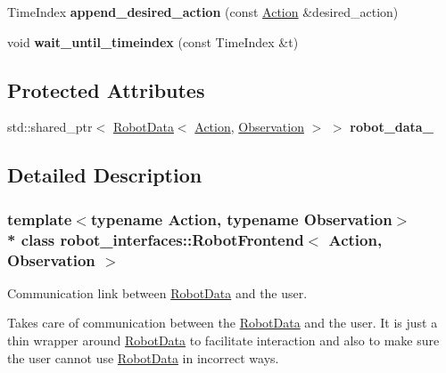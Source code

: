 \begin{DoxyCompactItemize}
\item 
Time\+Index {\bfseries append\+\_\+desired\+\_\+action} (const \hyperlink{classAction}{Action} \&desired\+\_\+action)\hypertarget{classrobot__interfaces_1_1RobotFrontend_a26c137f65b908d6eddffff75df38361a}{}\label{classrobot__interfaces_1_1RobotFrontend_a26c137f65b908d6eddffff75df38361a}

\item 
void {\bfseries wait\+\_\+until\+\_\+timeindex} (const Time\+Index \&t)\hypertarget{classrobot__interfaces_1_1RobotFrontend_a9b5242a6781e6028a84a6eb358b1ad10}{}\label{classrobot__interfaces_1_1RobotFrontend_a9b5242a6781e6028a84a6eb358b1ad10}

\end{DoxyCompactItemize}
\subsection*{Protected Attributes}
\begin{DoxyCompactItemize}
\item 
std\+::shared\+\_\+ptr$<$ \hyperlink{classrobot__interfaces_1_1RobotData}{Robot\+Data}$<$ \hyperlink{classAction}{Action}, \hyperlink{classObservation}{Observation} $>$ $>$ {\bfseries robot\+\_\+data\+\_\+}\hypertarget{classrobot__interfaces_1_1RobotFrontend_a256d4a3359c46caca9fe92d62b4ae413}{}\label{classrobot__interfaces_1_1RobotFrontend_a256d4a3359c46caca9fe92d62b4ae413}

\end{DoxyCompactItemize}


\subsection{Detailed Description}
\subsubsection*{template$<$typename Action, typename Observation$>$\\*
class robot\+\_\+interfaces\+::\+Robot\+Frontend$<$ Action, Observation $>$}

Communication link between \hyperlink{classrobot__interfaces_1_1RobotData}{Robot\+Data} and the user. 

Takes care of communication between the \hyperlink{classrobot__interfaces_1_1RobotData}{Robot\+Data} and the user. It is just a thin wrapper around \hyperlink{classrobot__interfaces_1_1RobotData}{Robot\+Data} to facilitate interaction and also to make sure the user cannot use \hyperlink{classrobot__interfaces_1_1RobotData}{Robot\+Data} in incorrect ways.


